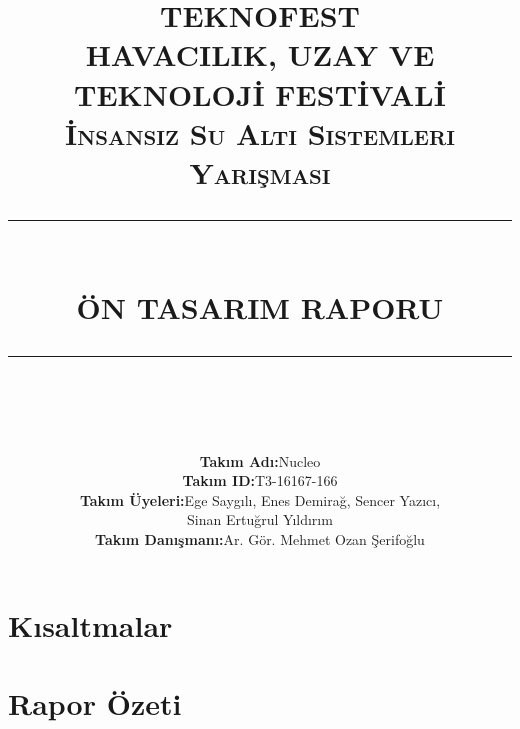 \documentclass[12pt]{article}
\newcommand{\HRule}[1]{\rule{\linewidth}{#1}}
\begin{document}
\title{\vspace{1cm}

\textsc{\LARGE TEKNOFEST}\\[0.5cm]
\textsc{\large HAVACILIK, UZAY VE TEKNOLOJİ FESTİVALİ}\\[0.5cm]
\textsc{\large İnsansız Su Altı Sistemleri Yarışması}\\[0.5cm]
\HRule{0.5pt} \\[0.4cm]
{\LARGE \bfseries ÖN TASARIM RAPORU}\\[0.3cm]
\HRule{0.5pt} \\[1.0cm]

\date{}
\author{


\begin{tabular}{l|l}
\textbf{Takım Adı:}       &   Nucleo\\
\textbf{Takım ID:}        &   T3-16167-166\\
\textbf{Takım Üyeleri:}   &   Ege Saygılı, Enes Demirağ, Sencer Yazıcı,\\ 
                          &   Sinan Ertuğrul Yıldırım\\
\textbf{Takım Danışmanı:} &   Ar. Gör. Mehmet Ozan Şerifoğlu 
\end{tabular}
}
}
\maketitle
\newpage

\tableofcontents

\newpage
{}
\section*{Kısaltmalar}


\newpage
\section{Rapor Özeti}
\end{document}

